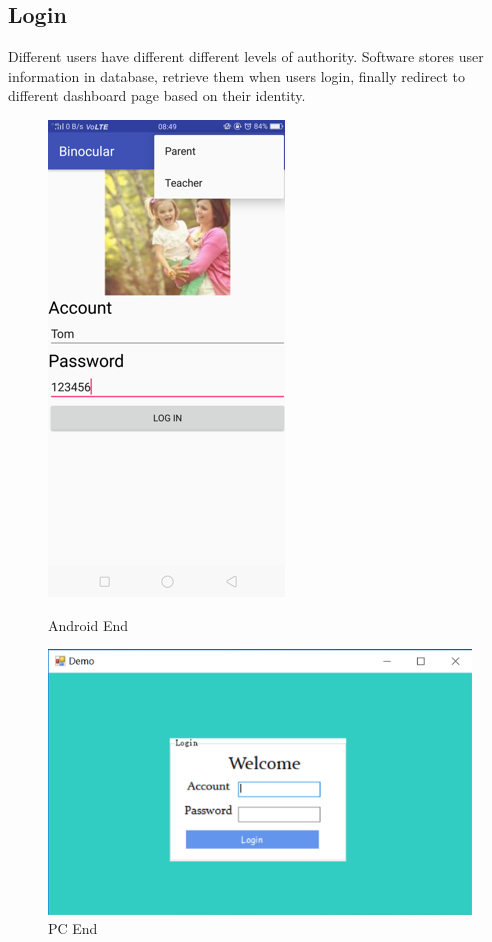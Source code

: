 \documentclass{article}
\begin{document}
\subsection{Login}
Different users have different different levels of authority. Software stores user information in database, retrieve them when users login, finally redirect to different dashboard page based on their identity.

 	\begin{figure}[H] 	
 		\begin{minipage}[b]{0.28\linewidth}
		 	\centering
	 		\includegraphics{img/login2.png}
 			\caption{Android End}
 		\end{minipage}
 		\begin{minipage}[b]{0.68\linewidth} 		
 	 		\centering
 			\includegraphics{img/login3.png}
 			\caption{PC End}
	 	\end{minipage}
 	\end{figure}
 	
\end{document}

